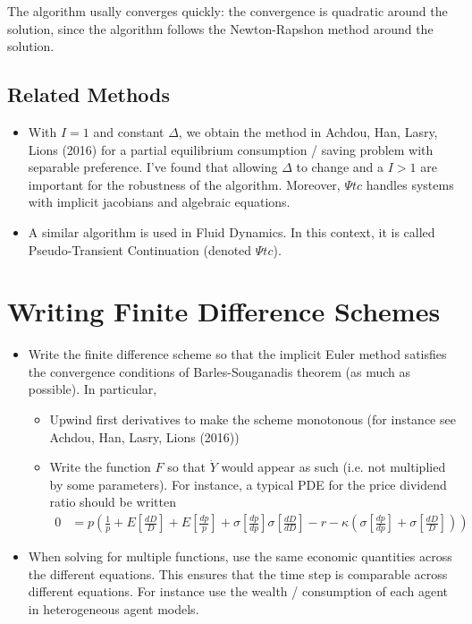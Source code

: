 \documentclass[english]{article}
\begin{document}
The algorithm usally converges quickly: the convergence is quadratic around the solution, since the algorithm follows the Newton-Rapshon method around the solution.

\subsection{Related Methods}
	
\begin{itemize}
	\item 
	With $I=1$ and constant $\Delta$, we obtain the method in Achdou, Han, Lasry, Lions (2016) for a partial equilibrium consumption / saving  problem with separable preference. I've found that allowing $\Delta$ to change  and a $I > 1$ are important for the robustness of the algorithm. Moreover, $\Psi tc$ handles systems with implicit jacobians and algebraic equations.

	\item 
	A similar algorithm is used in Fluid Dynamics. In this context, it is called Pseudo-Transient Continuation (denoted $\Psi tc$). 

\end{itemize}

\section{Writing Finite Difference Schemes}
\begin{itemize}
	\item 
	Write the finite difference scheme so that the implicit Euler method satisfies the convergence conditions of Barles-Souganadis theorem (as much as possible). In particular,
	\begin{itemize}
		\item Upwind first derivatives to make the scheme monotonous (for instance see Achdou, Han, Lasry, Lions (2016))
		\item Write the function $F$ so that $\dot{Y}$ would appear as such (i.e. not multiplied by some parameters). For instance, a typical PDE for the price dividend ratio should be written
		\begin{align*}
			0 &= p (\frac{1}{p} + E[\frac{dD}{D}] + E[\frac{dp}{p}] + \sigma[\frac{dp}{dp}]\sigma[\frac{dD}{dD}] - r - \kappa(\sigma[\frac{dp}{dp}] + \sigma[\frac{dD}{D}]))
		\end{align*}
	\end{itemize}
	\item When solving for multiple functions, use the same economic quantities across the different equations. This ensures that the time step is comparable across different equations. For instance use the wealth / consumption of each agent in heterogeneous agent models.
\end{itemize}
\end{document}
